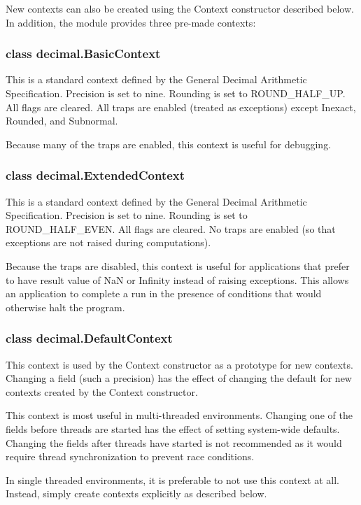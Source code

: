 New contexts can also be created using the Context constructor described below. In addition, the module provides three pre-made contexts:

\subsubsection{class decimal.BasicContext}

This is a standard context defined by the General Decimal Arithmetic Specification. Precision is set to nine. Rounding is set to ROUND\_HALF\_UP. All flags are cleared. All traps are enabled (treated as exceptions) except Inexact, Rounded, and Subnormal.

Because many of the traps are enabled, this context is useful for debugging.

\subsubsection{class decimal.ExtendedContext}

This is a standard context defined by the General Decimal Arithmetic Specification. Precision is set to nine. Rounding is set to ROUND\_HALF\_EVEN. All flags are cleared. No traps are enabled (so that exceptions are not raised during computations).

Because the traps are disabled, this context is useful for applications that prefer to have result value of NaN or Infinity instead of raising exceptions. This allows an application to complete a run in the presence of conditions that would otherwise halt the program.

\subsubsection{class decimal.DefaultContext}

This context is used by the Context constructor as a prototype for new contexts. Changing a field (such a precision) has the effect of changing the default for new contexts created by the Context constructor.

This context is most useful in multi-threaded environments. Changing one of the fields before threads are started has the effect of setting system-wide defaults. Changing the fields after threads have started is not recommended as it would require thread synchronization to prevent race conditions.

In single threaded environments, it is preferable to not use this context at all. Instead, simply create contexts explicitly as described below.

